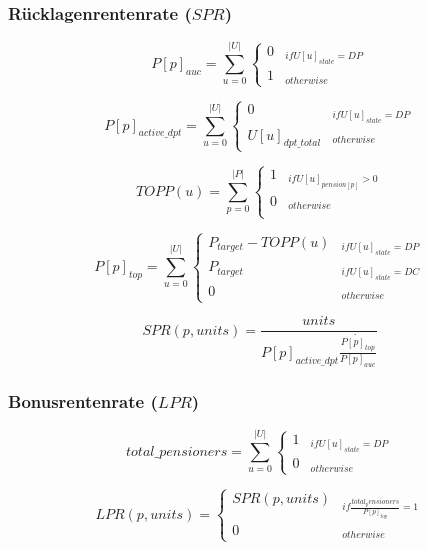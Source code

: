 \subsubsection*{Rücklagenrentenrate ($SPR$)}


\begin{equation}
P[p]_{auc} = \sum_{u=0}^{|U|} \begin{cases} 
0 & _{if U[u]_{state} = DP}\\
1 & _{otherwise}
\end{cases}
\end{equation}

\begin{equation}
P[p]_{active\_dpt} = \sum_{u=0}^{|U|} \begin{cases} 
0 & _{if U[u]_{state} = DP}\\
U[u]_{dpt\_total} & _{otherwise}
\end{cases}
\end{equation}

\begin{equation*}
TOPP(u) = \sum_{p=0}^{|P|} \begin{cases}
1 & _{if U[u]_{pension[p]} > 0}\\
0 & _{otherwise}\\
\end{cases}
\end{equation*}



\begin{equation}
P[p]_{top} = \sum_{u=0}^{|U|} \begin{cases} 
P_{target} - TOPP(u)  & _{if U[u]_{state} = DP}\\
P_{target} & _{if U[u]_{state} = DC}\\
0 & _{otherwise}
\end{cases}
\end{equation}

\begin{equation}
SPR(p, units) = \frac{units} {P[p]_{active\_dpt} \dot {\frac{P[p]_{top}} {P[p]_{auc}}}
}
\end{equation}


\subsubsection*{Bonusrentenrate ($LPR$)}


\begin{equation}
total\_pensioners =  \sum_{u=0}^{|U|} \begin{cases} 
1  & _{if U[u]_{state} = DP}\\
0 & _{otherwise}
\end{cases}
\end{equation}

\begin{equation}
LPR(p, units) =  \begin{cases} 
SPR(p, units)  & _{if \frac{total_pensioners} {P[p]_{top}} = 1}\\
0 & _{otherwise}
\end{cases}
\end{equation}$  $